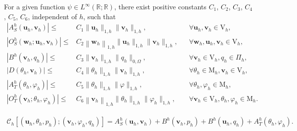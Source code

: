 \documentclass[10pt,a4paper]{amsart}
\begin{document}
  		\begin{theorem}\label{qa4}
  For a given function $\psi  \in L^{\infty}(\mathbb{R};\mathbb{R})$, there exist positive constants $C_1$, $C_2$, $C_3$, $C_4$, $C_5$, $C_6$, independent of $h$, such that
  		\begin{equation*}
  		\begin{aligned}
  		\left|{A}_S^h(\boldsymbol{u}_h, \boldsymbol{v}_h)\right| \leq& C_1 \|\boldsymbol{u}_h\|_{1, h}\|\boldsymbol{v}_h\|_{1,h}, &&  \forall \boldsymbol{u}_h, \boldsymbol{v}_h \in \mathrm{V}_h,
  		\\
  		\left|O_S^h\left(\boldsymbol{w}_h; \boldsymbol{u}_h, \boldsymbol{v}_h\right)\right| \leq& {C}_2 \left\|\boldsymbol{w}_h\right\|_{1,h}\|\boldsymbol{u}_h\|_{1,h}\|\boldsymbol{v}_h\|_{1, h}, && \forall \boldsymbol{w}_h, \boldsymbol{u}_h, \boldsymbol{v}_h \in \mathrm{V}_h,
  		\\
  		\left|{B}^h(\boldsymbol{v}_h, q_h)\right| \leq& C_3 \|\boldsymbol{v}_h\|_{1, h}\|q_h\|_{0, \Omega}, && \forall \boldsymbol{v}_h \in \mathrm{V}_h, q_h \in \Pi_h, \\ 
        \left| D( \theta_h, \boldsymbol{v}_h) \right|  \leq & C_4 \|\theta_h\|_{1,h}\|\boldsymbol{v}_h\|_{1,h} ,  && \forall \theta_h \in \mathrm{M}_h, \boldsymbol{v}_h \in \mathrm{V}_h, \\
        \left| A_T^h( \theta_h, \varphi_h)\right| \leq & C_5 \| \theta_h \|_{1,h} \| \varphi \|_{1,h} , && \forall  \theta_h, \varphi_h \in \mathrm{M}_h, \\
        \left| O_T^h(\boldsymbol{v}_h; \theta_h, \varphi_h) \right| \leq & C_6 \left\|\boldsymbol{v}_h\right\|_{1,h}\|\theta_h \|_{1,h}\|\varphi_h\|_{1,h} , && \forall \boldsymbol{v}_h \in \mathrm{V}_h, \theta_h, \varphi_h \in \mathrm{M}_h. 
  		\end{aligned}
  		\end{equation*}
        \end{theorem}  

  		\begin{align}\label{aa}
  		\mathcal{C}_h\left[(\boldsymbol{u}_h, \theta_h, p_h);( \boldsymbol{v}_h,\varphi_h, q_h)\right]={A}_S^h(\boldsymbol{u}_h, \boldsymbol{v}_h) + {B}^h(\boldsymbol{v}_h,p_h) + {B}^h(\boldsymbol{u}_h, q_h) +  {A}^h_T(\theta_h,\varphi_h) .
  		\end{align}
\end{document}
